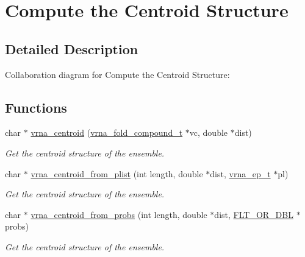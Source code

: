 \hypertarget{group__centroid__fold}{}\section{Compute the Centroid Structure}
\label{group__centroid__fold}


\subsection{Detailed Description}
Collaboration diagram for Compute the Centroid Structure\+:
\subsection*{Functions}
\begin{DoxyCompactItemize}
\item 
char $\ast$ \mbox{\hyperlink{group__centroid__fold_ga0e64bb67e51963dc71cbd4d30b80a018}{vrna\+\_\+centroid}} (\mbox{\hyperlink{group__fold__compound_ga1b0cef17fd40466cef5968eaeeff6166}{vrna\+\_\+fold\+\_\+compound\+\_\+t}} $\ast$vc, double $\ast$dist)
\begin{DoxyCompactList}\small\item\em Get the centroid structure of the ensemble. \end{DoxyCompactList}\item 
char $\ast$ \mbox{\hyperlink{group__centroid__fold_ga13881673a0b214d42a59140ef5764dbb}{vrna\+\_\+centroid\+\_\+from\+\_\+plist}} (int length, double $\ast$dist, \mbox{\hyperlink{group__struct__utils__plist_gab9ac98ab55ded9fb90043b024b915aca}{vrna\+\_\+ep\+\_\+t}} $\ast$pl)
\begin{DoxyCompactList}\small\item\em Get the centroid structure of the ensemble. \end{DoxyCompactList}\item 
char $\ast$ \mbox{\hyperlink{group__centroid__fold_ga98193ede06778a9ea966cc8fc43d0804}{vrna\+\_\+centroid\+\_\+from\+\_\+probs}} (int length, double $\ast$dist, \mbox{\hyperlink{group__data__structures_ga31125aeace516926bf7f251f759b6126}{F\+L\+T\+\_\+\+O\+R\+\_\+\+D\+BL}} $\ast$probs)
\begin{DoxyCompactList}\small\item\em Get the centroid structure of the ensemble. \end{DoxyCompactList}\end{DoxyCompactItemize}


